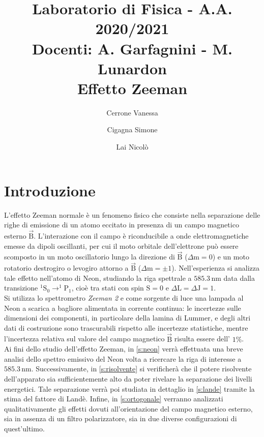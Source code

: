 \documentclass[twocolumn,10pt]{asme2ej}
\date{}
\title{{\huge\bfseries Laboratorio di Fisica} - {\LARGE A.A. 2020/2021} \\ 
    {\LARGE Docenti: A. Garfagnini - M. Lunardon} \\ {\Huge\bfseries Effetto Zeeman}}
\author{Cerrone Vanessa
    \affiliation{
    1200361\\
    vanessa.cerrone@studenti.unipd.it
    }	
}
\author{Cigagna Simone
    \affiliation{
	1193992\\
    simone.cigagna@studenti.unipd.it
    }	
}
\author{Lai Nicolò
    \affiliation{
	1193976\\
    nicolo.lai@studenti.unipd.it
    }	
}
\begin{document}
\maketitle    


\section{Introduzione}\label{s:introduzione}

L'effetto Zeeman normale è un fenomeno fisico che consiste nella separazione delle righe di emissione di un atomo
eccitato in presenza di un campo magnetico esterno $\vec{\text{B}}$. L'interazione con il campo è riconducibile a onde
elettromagnetiche emesse da dipoli oscillanti, per cui il moto orbitale dell'elettrone può essere scomposto in un moto
oscillatorio lungo la direzione di $\vec{\text{B}}$ ($\Delta \text{m} = 0$) e un moto rotatorio destrogiro o levogiro
attorno a $\vec{\text{B}}$ ($\Delta \text{m} = \pm1$). Nell'esperienza si analizza tale effetto nell'atomo di Neon,
studiando la riga spettrale a $585.3 \,\si{\nano\metre}$ data dalla transizione $ ^1\text{S}_0 \rightarrow ^1\text{P}_1$,
cioè tra stati con spin $\text{S} = 0$ e $\Delta \text{L}= \Delta \text{J} = 1$. \\
Si utilizza lo spettrometro \textit{Zeeman 2} e come sorgente di luce una lampada al Neon a scarica a bagliore
alimentata in corrente continua: le incertezze sulle dimensioni dei componenti, in particolare della lamina di Lummer, e
degli altri dati di costruzione sono trascurabili rispetto alle incertezze statistiche, mentre l'incertezza relativa sul
valore del campo magnetico $\vec{\text{B}}$ risulta essere dell' $1\%$.   \\

Ai fini dello studio dell'effetto Zeeman, in \autoref{s:neon} verrà effettuata una breve analisi dello spettro emissivo
del Neon volta a ricercare la riga di interesse a $585.3 \,\si{\nano\metre}$. Successivamente, in \autoref{s:risolvente}
si verificherà che il potere risolvente dell'apparato sia sufficientemente alto da poter rivelare la separazione dei
livelli energetici. Tale separazione verrà poi studiata in dettaglio in \autoref{s:lande} tramite la stima del fattore
di Landè. Infine, in \autoref{s:ortogonale} verranno analizzati qualitativamente gli effetti dovuti all'orientazione del
campo magnetico esterno, sia in assenza di un filtro polarizzatore, sia in due diverse configurazioni di quest'ultimo.
\end{document}
